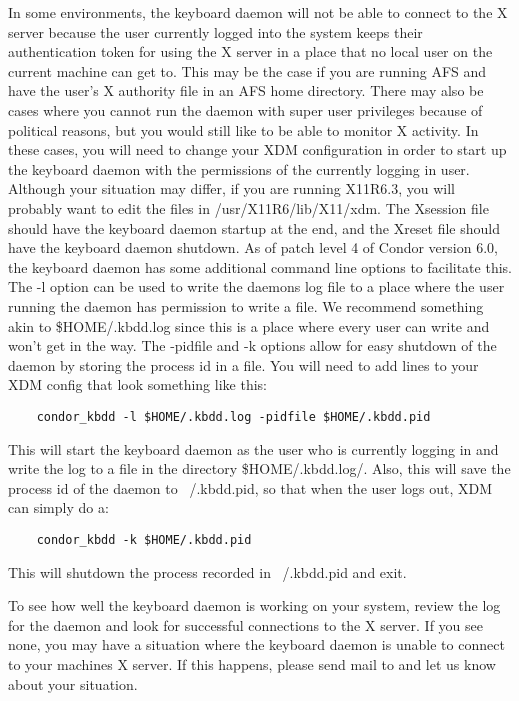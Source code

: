 In some environments, the keyboard daemon will not be able to connect to the X
server because the user currently logged into the system keeps their
authentication token for using the X server in a place that no local user on
the current machine can get to.  This may be the case if you are running AFS
and have the user's X authority file in an AFS home directory.  There may also
be cases where you cannot run the daemon with super user privileges because of
political reasons, but you would still like to be able to monitor X activity.
In these cases, you will need to change your XDM configuration in order to
start up the keyboard daemon with the permissions of the currently logging in
user.  Although your situation may differ, if you are running X11R6.3, you
will probably want to edit the files in /usr/X11R6/lib/X11/xdm.  The Xsession
file should have the keyboard daemon startup at the end, and the Xreset file
should have the keyboard daemon shutdown.  As of patch level 4 of Condor
version 6.0, the keyboard daemon has some additional command line options to
facilitate this.  The -l option can be used to write the daemons log file to a
place where the user running the daemon has permission to write a file.  We
recommend something akin to \$HOME/.kbdd.log since this is a place where every
user can write and won't get in the way.  The -pidfile and -k options allow
for easy shutdown of the daemon by storing the process id in a file.  You will
need to add lines to your XDM config that look something like this:

\begin{verbatim}
	condor_kbdd -l $HOME/.kbdd.log -pidfile $HOME/.kbdd.pid
\end{verbatim}

This will start the keyboard daemon as the user who is currently logging in
and write the log to a file in the directory \$HOME/.kbdd.log/.  Also, this
will save the process id of the daemon to ~/.kbdd.pid, so that when the user
logs out, XDM can simply do a:

\begin{verbatim}
	condor_kbdd -k $HOME/.kbdd.pid
\end{verbatim}

This will shutdown the process recorded in ~/.kbdd.pid and exit.

To see how well the keyboard daemon is working on your system, review
the log for the daemon and look for successful connections to the X
server.  If you see none, you may have a situation where the keyboard
daemon is unable to connect to your machines X server.  If this
happens, please send mail to  and let
us know about your situation.

